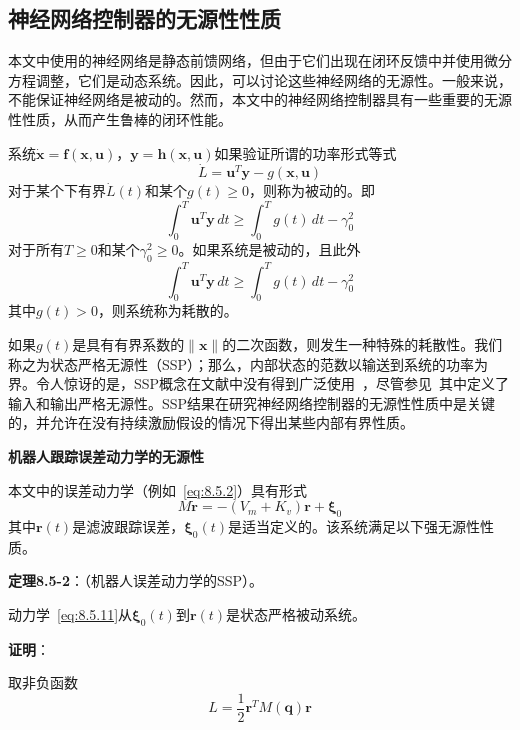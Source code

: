 \documentclass[12pt,a4paper]{ctexart}
\begin{document}
\subsection{神经网络控制器的无源性性质}

本文中使用的神经网络是静态前馈网络，但由于它们出现在闭环反馈中并使用微分方程调整，它们是动态系统。因此，可以讨论这些神经网络的无源性。一般来说，不能保证神经网络是被动的。然而，本文中的神经网络控制器具有一些重要的无源性性质，从而产生鲁棒的闭环性能。

系统$\dot{\bm{x}}=\bm{f}(\bm{x},\bm{u})$，$\bm{y}=\bm{h}(\bm{x},\bm{u})$如果验证所谓的功率形式等式~\cite{slotine1991}
\begin{equation}\label{eq:8.5.8}
\dot{L} = \bm{u}^T\bm{y} - g(\bm{x},\bm{u})
\end{equation}
对于某个下有界$\dot{L}(t)$和某个$g(t) \geq 0$，则称为被动的。即
\begin{equation}\label{eq:8.5.9}
\int_0^T \bm{u}^T\bm{y} \, dt \geq \int_0^T g(t) \, dt - \gamma_0^2
\end{equation}
对于所有$T \geq 0$和某个$\gamma_0^2 \geq 0$。如果系统是被动的，且此外
\begin{equation}\label{eq:8.5.10}
\int_0^T \bm{u}^T\bm{y} \, dt \geq \int_0^T g(t) \, dt - \gamma_0^2
\end{equation}
其中$g(t) > 0$，则系统称为耗散的。

如果$g(t)$是具有有界系数的$\|\bm{x}\|$的二次函数，则发生一种特殊的耗散性。我们称之为状态严格无源性（SSP）；那么，内部状态的范数以输送到系统的功率为界。令人惊讶的是，SSP概念在文献中没有得到广泛使用~\cite{lewis1993,seron1994}，尽管参见~\cite{goodwin1984}其中定义了输入和输出严格无源性。SSP结果在研究神经网络控制器的无源性性质中是关键的，并允许在没有持续激励假设的情况下得出某些内部有界性质。

\textbf{机器人跟踪误差动力学的无源性}

本文中的误差动力学（例如~\eqref{eq:8.5.2}）具有形式
\begin{equation}\label{eq:8.5.11}
M\dot{\bm{r}} = -(V_m + K_v)\bm{r} + \bm{\xi}_0
\end{equation}
其中$\bm{r}(t)$是滤波跟踪误差，$\bm{\xi}_0(t)$是适当定义的。该系统满足以下强无源性性质。

\textbf{定理8.5-2}：（机器人误差动力学的SSP）。

动力学~\eqref{eq:8.5.11}从$\bm{\xi}_0(t)$到$\bm{r}(t)$是状态严格被动系统。

\textbf{证明}：

取非负函数
\begin{equation}
L = \frac{1}{2}\bm{r}^T M(\bm{q})\bm{r}
\end{equation}
\end{document}
